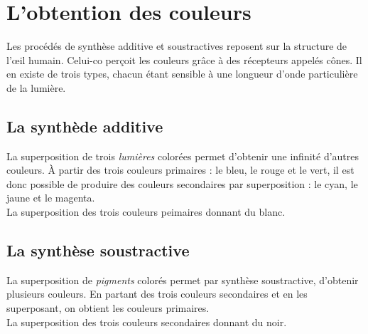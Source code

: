 \documentclass[a4paper,11pt,fleqn]{article}%
\begin{document}
	\maketitle

    \section{L'obtention des couleurs}
    Les procédés de synthèse additive et soustractives reposent sur la structure de l'\oe il humain. Celui-co perçoit les couleurs grâce à des récepteurs appelés cônes. Il en existe de trois types, chacun étant sensible à une longueur d'onde particulière de la lumière.
        \subsection{La synthède additive}
        \begin{minipage}{.7\linewidth}
            La superposition de trois \emph{lumières} colorées permet d'obtenir une infinité d'autres couleurs. À partir des trois couleurs primaires :  le bleu, le rouge et le vert, il est donc possible de produire des couleurs secondaires par superposition : le cyan, le jaune et le magenta.\\
            La superposition des trois couleurs peimaires donnant du blanc.
        \end{minipage}
        \begin{minipage}{.28\linewidth}
           \centering  {}
        \end{minipage}

        \subsection{La synthèse soustractive}
        \begin{minipage}{.7\linewidth}
            La superposition de \emph{pigments} colorés permet par synthèse soustractive, d'obtenir plusieurs couleurs. En partant des trois couleurs secondaires et en les superposant, on obtient les couleurs primaires.\\
            La superposition des trois couleurs secondaires donnant du noir.
        \end{minipage}
        \begin{minipage}{.28\linewidth}
            \centering  {}
        \end{minipage}
\end{document}
